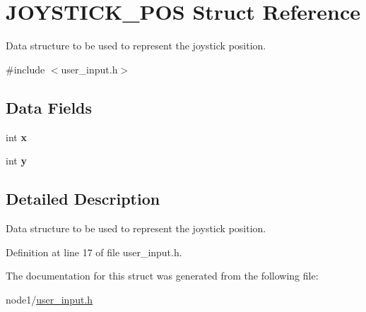 \hypertarget{structJOYSTICK__POS}{}\section{J\+O\+Y\+S\+T\+I\+C\+K\+\_\+\+P\+OS Struct Reference}
\label{structJOYSTICK__POS}


Data structure to be used to represent the joystick position.  




{\ttfamily \#include $<$user\+\_\+input.\+h$>$}

\subsection*{Data Fields}
\begin{DoxyCompactItemize}
\item 
\mbox{\label{structJOYSTICK__POS_a11a78aa4431dfe01724b41fe715be3b3}} 
int {\bfseries x}
\item 
\mbox{\label{structJOYSTICK__POS_a3b557ad6569a35299950e78fbe3495b1}} 
int {\bfseries y}
\end{DoxyCompactItemize}


\subsection{Detailed Description}
Data structure to be used to represent the joystick position. 

Definition at line 17 of file user\+\_\+input.\+h.



The documentation for this struct was generated from the following file\+:\begin{DoxyCompactItemize}
\item 
node1/\hyperlink{node1_2user__input_8h}{user\+\_\+input.\+h}\end{DoxyCompactItemize}
